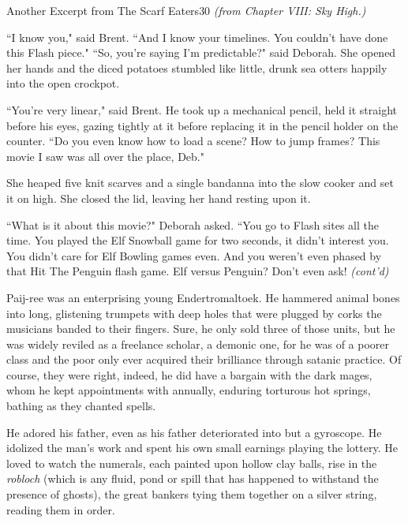 \documentclass[10pt,twoside]{report}
\begin{document}
	\begin{sidebar}{Another Excerpt from The Scarf Eaters}{30}
		\textit{(from Chapter VIII: Sky High.)}\vspace{6pt}
		
``I know you," said Brent. ``And I know your timelines. You couldn't have done this Flash piece."
``So, you're saying I'm predictable?" said Deborah. She opened her hands and the diced potatoes stumbled like little, drunk sea otters happily into the open crockpot.\vspace{6pt}

``You're very linear," said Brent. He took up a mechanical pencil, held it straight before his eyes, gazing tightly at it before replacing it in the pencil holder on the counter. ``Do you even know how to load a scene? How to jump frames? This movie I saw was all over the place, Deb."\vspace{6pt}

She heaped five knit scarves and a single bandanna into the slow cooker and set it on high. She closed the lid, leaving her hand resting upon it.\vspace{6pt}

``What is it about this movie?" Deborah asked. ``You go to Flash sites all the time. You played the Elf Snowball game for two seconds, it didn't interest you. You didn't care for Elf Bowling games even. And you weren't even phased by that Hit The Penguin flash game. Elf versus Penguin? Don't even ask! \textit{(cont'd)}
	\end{sidebar}

Paij-ree was an enterprising young Endertromaltoek.
He hammered animal bones into long, glistening trumpets with deep
holes that were plugged by corks the musicians banded to their
fingers.  Sure, he only sold three of those units, but he was widely
reviled as a freelance scholar, a demonic one, for he was of a poorer
class and the poor only ever acquired their brilliance through satanic
practice.  Of course, they were right, indeed, he did have a bargain
with the dark mages, whom he kept appointments with annually, enduring
torturous hot springs, bathing as they chanted spells.

He adored his father, even as his father deteriorated into but a
gyroscope.  He idolized the man's work and spent his own small
earnings playing the lottery.  He loved to watch the numerals, each
painted upon hollow clay balls, rise in the {\em robloch} (which is
any fluid, pond or spill that has happened to withstand the presence
of ghosts), the great bankers tying them together on a silver string,
reading them in order.
\end{document}
